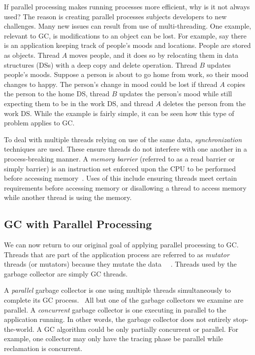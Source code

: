 \documentclass{sig-alternate}
\begin{document}
If parallel processing makes running processes more efficient, why is it not
always used? The reason is creating parallel processes subjects
developers to new challenges. Many new issues can result from use of
multi-threading. One example, relevant to GC, is modifications to an 
object can be lost. For example, say there is an application keeping 
track of people's moods and locations. People are stored as objects. 
Thread $A$ moves people, and it does so by relocating them in data structures (DSs) 
with a deep copy and delete operation. Thread $B$ updates people's moods. Suppose a person
is about to go home from work, so their mood changes to happy.
The person's change in mood could be lost if thread $A$ copies the person
to the home DS, thread $B$ updates the person's mood while still expecting
them to be in the work DS, and thread $A$ deletes the person from the work DS. 
While the example is fairly simple, it can be seen how this type of problem
applies to GC.

To deal with multiple threads relying on use of the same data, \emph{synchronization}
techniques are used. These ensure threads do not interfere
with one another in a process-breaking manner. A \emph{memory barrier} (referred to 
as a read barrier or simply barrier) is an instruction set enforced upon the 
CPU to be performed before accessing memory~\cite{wiki:barrier}. Uses of this include ensuring threads
meet certain requirements before accessing memory or disallowing a thread to
access memory while another thread is using the memory.


\subsection{GC with Parallel Processing}
\label{sec:parallelProcessingGarbageCollection}

We can now return to our original goal of applying parallel processing to GC.
Threads that are part of the application process are referred to as \emph{mutator}
threads (or mutators) because they mutate the data~\cite{Tene:C4}~\cite{Iyengar:Collie}
\cite{Osterlund:FPP}. Threads used by the garbage collector are simply GC threads.

A \emph{parallel} garbage collector is one using
multiple threads simultaneously to complete its GC process.~\cite{Puffitsch:background}
All but one of the garbage collectors we examine are parallel. A \emph{concurrent} garbage
collector is one executing in parallel to the application running. In other 
words, the garbage collector does not entirely stop-the-world. A GC algorithm
could be only partially concurrent or parallel. For example, one collector may
only have the tracing phase be parallel while reclamation is concurrent.
\end{document}
